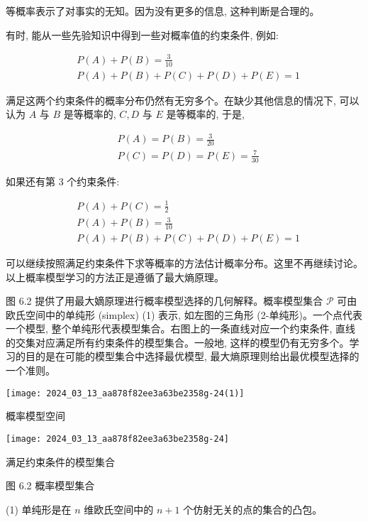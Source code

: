\documentclass[10pt]{article}
\begin{document}
\begin{CJK*}{UTF8}{bsmi}
等概率表示了对事实的无知。因为没有更多的信息, 这种判断是合理的。

有时, 能从一些先验知识中得到一些对概率值的约束条件, 例如:

$$
\begin{aligned}
& P(A)+P(B)=\frac{3}{10} \\
& P(A)+P(B)+P(C)+P(D)+P(E)=1
\end{aligned}
$$

满足这两个约束条件的概率分布仍然有无穷多个。在缺少其他信息的情况下, 可以认为 $A$ 与 $B$ 是等概率的, $C, D$ 与 $E$ 是等概率的, 于是,

$$
\begin{aligned}
& P(A)=P(B)=\frac{3}{20} \\
& P(C)=P(D)=P(E)=\frac{7}{30}
\end{aligned}
$$

如果还有第 3 个约束条件:

$$
\begin{aligned}
& P(A)+P(C)=\frac{1}{2} \\
& P(A)+P(B)=\frac{3}{10} \\
& P(A)+P(B)+P(C)+P(D)+P(E)=1
\end{aligned}
$$

可以继续按照满足约束条件下求等概率的方法估计概率分布。这里不再继续讨论。以上概率模型学习的方法正是遵循了最大熵原理。

图 6.2 提供了用最大嫡原理进行概率模型选择的几何解释。概率模型集合 $\mathcal{P}$ 可由欧氏空间中的单纯形 (simplex) (1) 表示, 如左图的三角形 (2-单纯形)。一个点代表一个模型, 整个单纯形代表模型集合。右图上的一条直线对应一个约束条件, 直线的交集对应满足所有约束条件的模型集合。一般地, 这样的模型仍有无穷多个。学习的目的是在可能的模型集合中选择最优模型, 最大熵原理则给出最优模型选择的一个准则。

\begin{center}
\texttt{[image: 2024\_03\_13\_aa878f82ee3a63be2358g-24(1)]}
\end{center}

概率模型空间

\begin{center}
\texttt{[image: 2024\_03\_13\_aa878f82ee3a63be2358g-24]}
\end{center}

满足约束条件的模型集合

图 6.2 概率模型集合

(1) 单纯形是在 $n$ 维欧氏空间中的 $n+1$ 个仿射无关的点的集合的凸包。


\end{CJK*}
\end{document}
